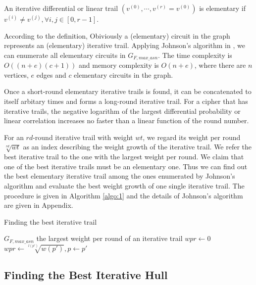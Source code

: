 \begin{definition}
    An iterative differential or linear trail $(v^{(0)},\cdots,v^{(r)}=v^{(0)})$ is elementary if $v^{(i)}\neq v^{(j)},\forall i,j\in [0,r-1]$.
\end{definition}

According to the definition, Obiviously a (elementary) circuit in the graph represents an (elementary) iterative trail. Applying Johnson's algorithm in \cite{J75}, we can enumerate all elementary circuits in $G_{F,max\_asn}$. The time complexity is $O((n + e)(c + 1))$ and memory complexity is $O(n + e)$, where there are $n$ vertices, $e$ edges and $c$ elementary circuits in the graph.

Once a short-round elementary iterative trails is found, it can be concatenated to itself arbitary times and forms a long-round iterative trail. For a cipher that has iterative trails, the negative logarithm of the largest differential probability or linear correlation increases no faster than a linear function of the round number. 

For an $rd$-round iterative trail with weight $wt$, we regard its weight per round $\sqrt[rd]{wt}$ as an index describing the weight growth of the iterative trail. We refer the best iterative trail to the one with the largest weight per round. We claim that one of the best iterative trails must be an elementary one. Thus we can find out the best elementary iterative trail among the ones enumerated by Johnson's algorithm \cite{J75} and evaluate the best weight growth of one single iterative trail. The procedure is given in Algorithm \ref{algo:1} and the details of Johnson's algorithm are given in Appendix. 

\begin{algorithm}
	\caption{Finding the best iterative trail}
	\label{algo:1}
	\begin{algorithmic}[1]
		\Require $G_{F,max\_asn}$
		\Ensure the largest weight per round of an iterative trail
		\Procedure {}{}
		\State $wpr\leftarrow 0$
		\State $wpr\leftarrow \sqrt[l(p')]{w(p')},p\leftarrow p'$
		\EndIf
		\EndFor
		\State {}
		\EndProcedure
	\end{algorithmic}
\end{algorithm}

\subsection{Finding the Best Iterative Hull}\label{sec:fbih}

